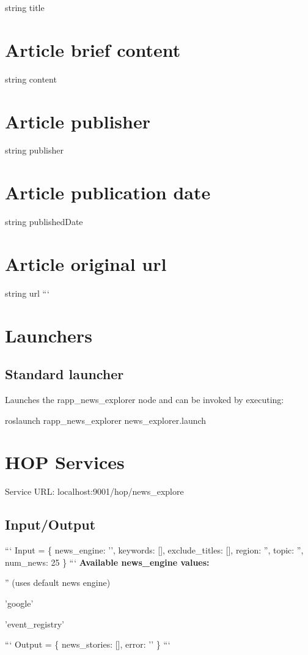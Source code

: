 string title \section*{Article brief content}

string content \section*{Article publisher}

string publisher \section*{Article publication date}

string published\-Date \section*{Article original url}

string url ```

\section*{Launchers}

\subsection*{Standard launcher}

Launches the rapp\-\_\-news\-\_\-explorer node and can be invoked by executing\-:

{\ttfamily roslaunch rapp\-\_\-news\-\_\-explorer news\-\_\-explorer.\-launch}

\section*{H\-O\-P Services}

Service U\-R\-L\-: {\ttfamily localhost\-:9001/hop/news\-\_\-explore}

\subsection*{Input/\-Output}

``` Input = \{ news\-\_\-engine\-: '', keywords\-: \mbox{[}\mbox{]}, exclude\-\_\-titles\-: \mbox{[}\mbox{]}, region\-: '', topic\-: '', num\-\_\-news\-: 25 \} ``` {\bfseries Available news\-\_\-engine values\-:}
\begin{DoxyItemize}
\item '' (uses default news engine)
\item 'google'
\item 'event\-\_\-registry'
\end{DoxyItemize}

``` Output = \{ news\-\_\-stories\-: \mbox{[}\mbox{]}, error\-: '' \} ``` 